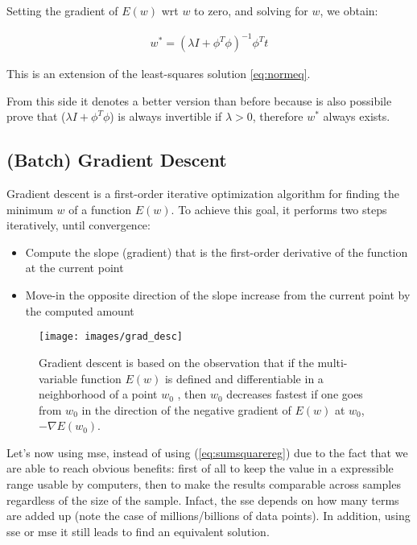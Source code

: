 \noindent Setting the gradient of $E(w)$ \gls{wrt} $w$ to zero, and solving for $w$, we obtain:

\begin{Equation}[H]
	\centering
		\begin{equation} \label{eq:least-square-stepf}
			\begin{aligned}
				w^* = (\lambda I + \phi^T \phi)^{-1} \phi^T t
			\end{aligned}
		\end{equation}
		\caption[Ridge regression solution]{This is an extension of the least-squares solution \ref{eq:normeq}.}
\end{Equation}

\noindent From this side it denotes a better version than before because is also possibile prove that ($\lambda I + \phi^T \phi$) is always invertible if $\lambda > 0$, therefore $w^*$ always exists.

\subsection{(Batch) Gradient Descent}
\label{subsec:batchgradientdescen}
\noindent Gradient descent is a first-order iterative optimization algorithm for finding the minimum $w$ of a function $E(w)$. To achieve this goal, it performs two steps iteratively, until convergence:

\begin{itemize}
	\item Compute the slope (gradient) that is the first-order derivative of the function at the current point
	\item Move-in the opposite direction of the slope increase from the current point by the computed amount
\end{itemize}

\begin{figure}[H]
	\centering
	\texttt{[image: images/grad\_desc]}
	\caption[Gradient descent.]{Gradient descent is based on the observation that if the multi-variable function $E(w)$ is defined and differentiable in a neighborhood of a point $w_0$ , then $w_0$ decreases fastest if one goes from $w_0$  in the direction of the negative gradient of $E(w)$ at $w_0$, $-\nabla E(w_0)$.}
	\label{fig:grad_desc}
\end{figure}

\noindent Let's now using \gls{mse}, instead of using (\ref{eq:sumsquarereg}) due to the fact that we are able to reach obvious benefits: first of all to keep the value in a expressible range usable by computers, then to make the results comparable across samples regardless of the size of the sample. Infact, the \gls{sse} depends on how many terms are added up (note the case of millions/billions of data points). In addition, using \gls{sse} or \gls{mse} it still leads to find an equivalent solution.

